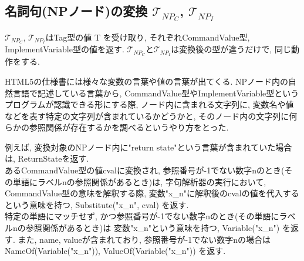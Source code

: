 \documentclass[uplatex,a4j]{jsreport}
\begin{document}
    
\subsection{名詞句(NPノード)の変換 $\mathcal{T}_{NP_C}$, $\mathcal{T}_{NP_I}$}
$\mathcal{T}_{NP_C}$, $\mathcal{T}_{NP_I}$はTag型の値 T を受け取り, それぞれCommandValue型, ImplementVariable型の値を返す. 
$\mathcal{T}_{NP_C}$と$\mathcal{T}_{NP_I}$は変換後の型が違うだけで, 同じ動作をする. 

HTML5の仕様書には様々な変数の言葉や値の言葉が出てくる. 
NPノード内の自然言語で記述している言葉から, CommandValue型やImplementVariable型というプログラムが認識できる形にする際, 
ノード内に含まれる文字列に, 変数名や値などを表す特定の文字列が含まれているかどうかと, 
そのノード内の文字列に何らかの参照関係が存在するかを調べるというやり方をとった. 

例えば, 変換対象のNPノード内に"return state"という言葉が含まれていた場合は, ReturnStateを返す. \\

あるCommandValue型の値cvalに変換され, 参照番号が-1でない数字nのとき(その単語にラベルnの参照関係があるとき)は, 
字句解析器の実行において, CommandValue型の意味を解釈する際, 変数"x\_n"に解釈後のcvalの値を代入するという意味を持つ, 
Substitute("x\_n", cval) を返す. \\

特定の単語にマッチせず, かつ参照番号が-1でない数字nのとき(その単語にラベルnの参照関係があるとき)は 変数"x\_n"という意味を持つ, Variable("x\_n") を返す.
また, name, valueが含まれており, 参照番号が-1でない数字nの場合はNameOf(Variable("x\_n")), ValueOf(Variable("x\_n")) を返す.
\end{document}
